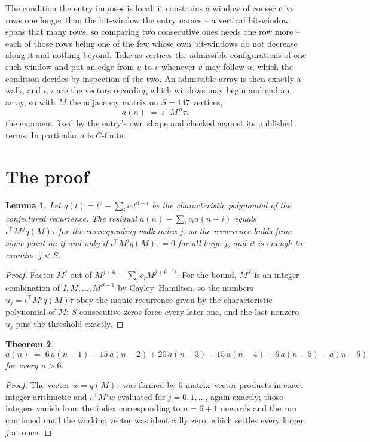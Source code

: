 \documentclass[11pt,a4paper]{article}
\theoremstyle{plain}
\newtheorem{theorem}{Theorem}
\newtheorem{lemma}[theorem]{Lemma}
\theoremstyle{definition}
\begin{document}
The condition the entry imposes is local: it constrains a window of consecutive rows one longer than the bit-window the entry names -- a vertical bit-window spans that many rows, so comparing two consecutive ones needs one row more -- each of those rows being one of the few whose own bit-windows do not decrease along it and nothing beyond. Take as vertices the admissible configurations of one such window and put an edge from $u$ to $v$ whenever $v$ may follow $u$, which the condition decides by inspection of the two.
An admissible array is then exactly a walk, and $\iota,\tau$ are the vectors recording which windows may begin and end an array, so with $M$ the adjacency matrix on $S=147$ vertices,
\[
a(n)\;=\;\iota^{\!\top}M^{\,n}\tau ,
\]
the exponent fixed by the entry's own shape and checked against its published terms. In
particular $a$ is $C$-finite.

\section{The proof}

\begin{lemma}\label{lem:crit}
Let $q(t)=t^{6}-\sum_i c_it^{6-i}$ be the characteristic polynomial of the
conjectured recurrence. The residual $a(n)-\sum_ic_ia(n-i)$ equals
$\iota^{\!\top}M^{\,j}q(M)\tau$ for the corresponding walk index $j$, so the recurrence
holds from some point on if and only if $\iota^{\!\top}M^{j}q(M)\tau=0$ for all large $j$,
and it is enough to examine $j<S$.
\end{lemma}

\begin{proof}
Factor $M^{j}$ out of $M^{j+6}-\sum_ic_iM^{j+6-i}$. For the bound, $M^{S}$
is an integer combination of $I,M,\dots,M^{S-1}$ by Cayley--Hamilton, so the numbers
$u_j=\iota^{\!\top}M^{j}q(M)\tau$ obey the monic recurrence given by the characteristic
polynomial of $M$; $S$ consecutive zeros force every later one, and the last nonzero $u_j$
pins the threshold exactly.
\end{proof}

\begin{theorem}
\[
a(n)\;=\;6\,a(n-1) - 15\,a(n-2) + 20\,a(n-3) - 15\,a(n-4) + 6\,a(n-5) - a(n-6)
\]
for every $n>6$.
\end{theorem}

\begin{proof}
The vector $w=q(M)\tau$ was formed by $6$ matrix--vector products in exact integer
arithmetic and $\iota^{\!\top}M^{j}w$ evaluated for $j=0,1,\dots$, again exactly; those
integers vanish from the index corresponding to $n=6+1$ onwards and the run continued
until the working vector was identically zero, which settles every larger $j$ at once.
\end{proof}
\end{document}
